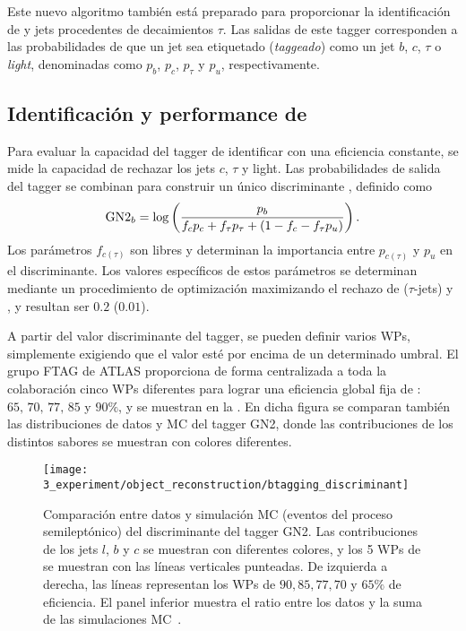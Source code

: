 Este nuevo algoritmo también está preparado para proporcionar la identificación de \cjets y jets procedentes de decaimientos \(\tau\). Las salidas de este tagger corresponden a las probabilidades de que un jet sea etiquetado (\textit{taggeado}) como un jet \(b\), \(c\), \(\tau\) o \textit{light}, denominadas como \(p_b\), \(p_c\), \(p_{\tau}\) y \(p_u\), respectivamente.

\subsection{Identificaci\'on y performance de \btagging}

Para evaluar la capacidad del tagger de identificar \bjets con una eficiencia constante, se mide la capacidad de rechazar los jets \(c\), \(\tau\) y light. Las probabilidades de salida del tagger se combinan para construir un único discriminante \gntb, definido como
\begin{equation}
    \text{GN2}_{b} = \log \left(
        \frac{p_b}{f_c p_c + f_{\tau} p_{\tau} + \left(1-f_c-f_{\tau}p_u\right)}
    \right).
\end{equation}
Los parámetros \(f_{c(\tau)}\) son libres y determinan la importancia entre \(p_{c(\tau)}\) y \(p_u\) en el discriminante. Los valores específicos de estos parámetros se determinan mediante un procedimiento de optimización maximizando el rechazo de \cjets (\(\tau\)-jets) y \ljets, y resultan ser \(0.2\) (\(0.01\)).


A partir del valor discriminante del tagger, se pueden definir varios \acp{WP}, simplemente exigiendo que el valor \gntb esté por encima de un determinado umbral. El grupo \ac{FTAG} de \ac{ATLAS} proporciona de forma centralizada a toda la colaboración cinco \acp{WP} diferentes para lograr una eficiencia global fija de \btagging: \(65,\, 70,\, 77,\, 85\) y \(90\%\), y se muestran en la \Fig{\ref{fig:objects:jet_tagging:btag_discrminant}}. En dicha figura se comparan tambi\'en las distribuciones de datos y \ac{MC} del tagger GN2, donde las contribuciones de los distintos sabores se muestran con colores diferentes.

\begin{figure}[ht!]
    \centering
    \texttt{[image: 3\_experiment/object\_reconstruction/btagging\_discriminant]}
    \caption{Comparaci\'on entre datos y simulaci\'on \ac{MC} (eventos del proceso \ttbar semilept\'onico) del discriminante del tagger GN2. Las contribuciones de los jets \(l\), \(b\) y \(c\) se muestran con diferentes colores, y los 5 \acp{WP} de \btagging se muestran con las l\'ineas verticales punteadas. De izquierda a derecha, las l\'ineas representan los \acp{WP} de \(90, 85, 77, 70\) y \(65\%\) de eficiencia. El panel inferior muestra el ratio entre los datos y la suma de las simulaciones \ac{MC}~\cite{ATLAS-FTAG-GN2BtagWPs}.}
    \label{fig:objects:jet_tagging:btag_discrminant}
\end{figure}

